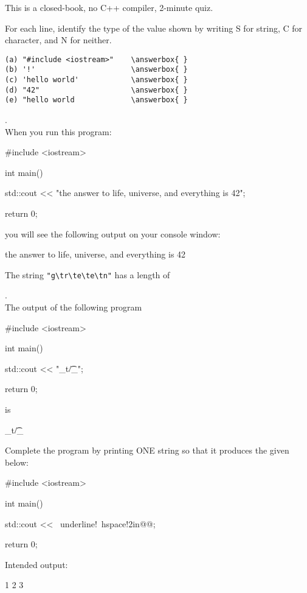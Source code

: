 

\renewcommand\AUTHOR{} %


\topmattertwo

This is a closed-book, no C++ compiler, 2-minute quiz.

\nextq
For each line, identify the type of the value shown
by writing S for string, C for character, and N for neither.
\begin{Verbatim}[commandchars=\\\{\}]
(a) "#include <iostream>"    \answerbox{ }  
(b) '!'                      \answerbox{ } 
(c) 'hello world'            \answerbox{ } 
(d) "42"                     \answerbox{ } 
(e) "hello world             \answerbox{ } 
\end{Verbatim}


\nextq \tf.
\dotfill
\answerbox{ }
\\
When you run this program:
\begin{console}[fontsize=\small]
#include <iostream>

int main()
{
    std::cout << "the answer to life, universe, and everything is 42\n";

    return 0;
}
\end{console}
you will see the following output on your console window:
\begin{console}[fontsize=\small]
the answer to life, universe, and everything is 42\n
\end{console}

\nextq
The string \verb!"g\tr\te\te\tn"!
has a length of  
\answerbox{}


\nextq \tf. 
\dotfill\answerbox{ }
\\
The output of the following program
\begin{console}[fontsize=\small]
#include <iostream>

int main()
{
    std::cout << "_t/\t_\n";
    
    return 0;
}
\end{console}
is
\begin{console}[fontsize=\small]
_t/\t_
\end{console}

\nextq
Complete the program by printing
ONE string so that 
it produces the given below:
\begin{console}[commandchars=\~\!\@,fontsize=\small]
#include <iostream>

int main()
{
    std::cout << ~underline!~hspace!2in@@;
    
    return 0;
}
\end{console}
Intended output:
\begin{console}[fontsize=\small]
1
2
3
\end{console}
\ANSWER
\begin{answercode}

\end{answercode}


%

